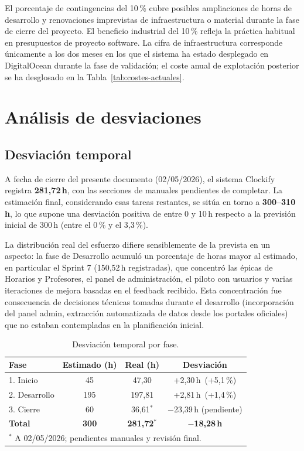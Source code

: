 El porcentaje de contingencias del 10\,\% cubre posibles ampliaciones de horas de desarrollo y renovaciones imprevistas de infraestructura o material durante la fase de cierre del proyecto. El beneficio industrial del 10\,\% refleja la práctica habitual en presupuestos de proyecto software. La cifra de infraestructura corresponde únicamente a los dos meses en los que el sistema ha estado desplegado en DigitalOcean durante la fase de validación; el coste anual de explotación posterior se ha desglosado en la Tabla~\ref{tab:costes-actuales}.


\section{Análisis de desviaciones}\label{sec:desviaciones}

\subsection{Desviación temporal}

A fecha de cierre del presente documento (02/05/2026), el sistema Clockify registra \textbf{281,72\,h}, con las secciones de manuales pendientes de completar. La estimación final, considerando esas tareas restantes, se sitúa en torno a \textbf{300--310\,h}, lo que supone una desviación positiva de entre 0 y 10\,h respecto a la previsión inicial de 300\,h (entre el 0\,\% y el 3,3\,\%).

La distribución real del esfuerzo difiere sensiblemente de la prevista en un aspecto: la fase de Desarrollo acumuló un porcentaje de horas mayor al estimado, en particular el Sprint 7 (150,52\,h registradas), que concentró las épicas de Horarios y Profesores, el panel de administración, el piloto con usuarios y varias iteraciones de mejora basadas en el feedback recibido. Esta concentración fue consecuencia de decisiones técnicas tomadas durante el desarrollo (incorporación del panel admin, extracción automatizada de datos desde los portales oficiales) que no estaban contempladas en la planificación inicial.

\begin{table}[hbtp]
\centering
\small
\begin{tabular}{|l|c|c|c|}
\hline
\textbf{Fase} & \textbf{Estimado (h)} & \textbf{Real (h)} & \textbf{Desviación} \\ \hline
1. Inicio     &  45 &  47,30 & +2,30\,h \,(+5,1\,\%) \\ \hline
2. Desarrollo & 195 & 197,81 & +2,81\,h \,(+1,4\,\%) \\ \hline
3. Cierre     &  60 &  36,61$^*$ & $-$23,39\,h (pendiente) \\ \hline
\textbf{Total}&\textbf{300} & \textbf{281,72$^*$} & \textbf{$-$18,28\,h} \\ \hline
\multicolumn{4}{l}{\footnotesize $^*$ A 02/05/2026; pendientes manuales y revisión final.}
\end{tabular}
\caption{Desviación temporal por fase.}
\label{tab:desviacion-temporal}
\end{table}

